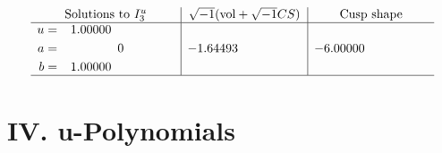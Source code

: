 \documentclass[1p]{elsarticle_modified}
\theoremstyle{definition}
\newcommand{\I}{\sqrt{-1}}
\begin{document}
$$\begin{array}{c|c|c}  
\text{Solutions to }I^u_{3}& \I (\text{vol} + \sqrt{-1}CS) & \text{Cusp shape}\\
 \hline 
\begin{aligned}
u &= \phantom{-}1.00000\phantom{ +0.000000I} \\
a &= \phantom{-0.000000 } 0 \\
b &= \phantom{-}1.00000\phantom{ +0.000000I}\end{aligned}
 & -1.64493\phantom{ +0.000000I} & -6.00000\phantom{ +0.000000I}\\
 \hline 
 \end{array}$$\newpage
\newpage\renewcommand{\arraystretch}{1}
\centering \section*{ IV. u-Polynomials}
\end{document}
